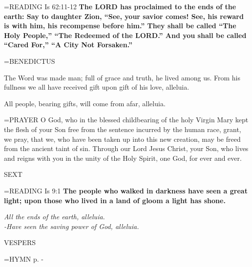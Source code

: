\hangindent=\parindent \small{\uppercase{READING}}    Is 62:11-12 \textbf{   The LORD has proclaimed to the ends of the earth: Say to daughter Zion, “See, your savior comes! See, his reward is with him, his recompense before him.” They shall be called “The Holy People,” “The Redeemed of the LORD.” And you shall be called “Cared For,” “A City Not Forsaken.”\\}

\hangindent=\parindent \small BENEDICTUS
\begin{description}[labelindent=\parindent, leftmargin=*]
\item [(before the Epiphany):]  The Word was made man; full of grace and truth, he lived among us. From his fullness we all have received gift upon gift of his love, alleluia.
\item [(Thursday after the Epiphany):]  All people, bearing gifts, will come from afar, alleluia.
\end{description}


\hangindent=\parindent \small{PRAYER 	O God, who in the blessed childbearing of the holy Virgin Mary kept the flesh of your Son free from the sentence incurred by the human race, grant, we pray, that we, who have been taken up into this new creation, may be freed from the ancient taint of sin. Through our Lord Jesus Christ, your Son, who lives and reigns with you in the unity of the Holy Spirit, one God, for ever and ever.}

\begin{flushleft}\normalsize SEXT\\\end{flushleft}

\hangindent=\parindent \small{\uppercase{READING}}    Is 9:1 \textbf{   The people who walked in darkness have seen a great light; upon those who lived in a land of gloom a light has shone.\\}

\begin{center}
\textit{All the ends of the earth, alleluia.\\
-Have seen the saving power of God, alleluia.}
\end{center}

\begin{flushleft}\normalsize VESPERS\\\end{flushleft}

\hangindent=\parindent \small{\uppercase{HYMN} p. \pageref{christmas:firstHymn}-\pageref{christmas:lastHymn}\\}

